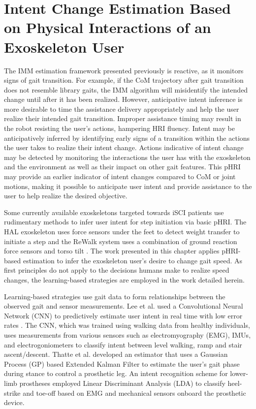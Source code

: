 \chapter{Intent Change Estimation Based on Physical Interactions of an	Exoskeleton User}\label{chapter:BKF}

The IMM estimation framework presented previously is reactive, as it monitors signs of gait transition. For example, if the CoM trajectory after gait transition does not resemble library gaits, the IMM algorithm will misidentify the intended change until after it has been realized. However, anticipative intent inference is more desirable to time the assistance delivery appropriately and help the user realize their intended gait transition. Improper assistance timing may result in the robot resisting the user's actions, hampering HRI fluency. Intent may be anticipatively inferred by identifying early signs of a transition within the actions the user takes to realize their intent change. Actions indicative of intent change may be detected by monitoring the interactions the user has with the exoskeleton and the environment as well as their impact on other gait features. This pHRI may provide an earlier indicator of intent changes compared to CoM or joint motions, making it possible to anticipate user intent and provide assistance to the user to help realize the desired objective. 

Some currently available exoskeletons targeted towards iSCI patients use rudimentary methods to infer user intent for step initiation via basic pHRI. The HAL exoskeleton uses force sensors under the feet to detect weight transfer to initiate a step \cite{suzuki2007intention} and the ReWalk system uses a combination of ground reaction force sensors and torso tilt \cite{goffer2012locomotion}. The work presented in this chapter applies pHRI-based estimation to infer the exoskeleton user's desire to change gait speed. As first principles do not apply to the decisions humans make to realize speed changes, the learning-based strategies are employed in the work detailed herein.

Learning-based strategies use gait data to form relationships between the observed gait and sensor measurements. Lee et al. used a Convolutional Neural Network (CNN) to predictively estimate user intent in real time with low error rates \cite{lee2020image}. The CNN, which was trained using walking data from healthy individuals, uses measurements from various sensors such as electromyography (EMG), IMUs, and electrogoniometers to classify intent between level walking, ramp and stair ascent/descent. Thatte et al. developed an estimator that uses a Gaussian Process (GP) based Extended Kalman Filter \cite{thatte2019robust} to estimate the user's gait phase during stance to control a prosthetic leg. An intent recognition scheme for lower-limb prostheses \cite{young2013classifying} employed Linear Discriminant Analysis (LDA) to classify heel-strike and toe-off based on EMG and mechanical sensors onboard the prosthetic device. 

